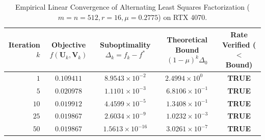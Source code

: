 \documentclass[journal]{IEEEtran}
\begin{document}
\begin{table}[h]
\centering
\caption{Empirical Linear Convergence of Alternating Least Squares Factorization ($m=n=512, r=16, \mu=0.2775$) on RTX 4070.}
\label{tab:als_convergence}
\begin{tabular}{rcccc}
\toprule
\textbf{Iteration} $k$ & \textbf{Objective} $f(\mathbf{U}_k, \mathbf{V}_k)$ & \textbf{Suboptimality} $\Delta_k = f_k - f^*$ & \textbf{Theoretical Bound} $(1 - \mu)^k \Delta_0$ & \textbf{Rate Verified ($<$ Bound)} \\
\midrule
$1$  & $0.109411$ & $8.9543 \times 10^{-2}$ & $2.4994 \times 10^{0\phantom{-}}$ & \textbf{TRUE} \\
$5$  & $0.020978$ & $1.1101 \times 10^{-3}$ & $6.8106 \times 10^{-1}$ & \textbf{TRUE} \\
$10$ & $0.019912$ & $4.4599 \times 10^{-5}$ & $1.3408 \times 10^{-1}$ & \textbf{TRUE} \\
$25$ & $0.019867$ & $2.6034 \times 10^{-9}$ & $1.0232 \times 10^{-3}$ & \textbf{TRUE} \\
$50$ & $0.019867$ & $1.5613 \times 10^{-16}$ & $3.0261 \times 10^{-7}$ & \textbf{TRUE} \\
\bottomrule
\end{tabular}
\end{table}
\end{document}
